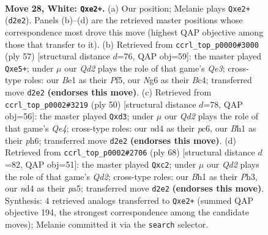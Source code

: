 \documentclass[11pt]{article}
\begin{document}
\clearpage

\begin{figure}[p]\centering
\begin{subfigure}{0.46\textwidth}\centering
\resizebox{\linewidth}{!}{%
\newchessgame
\chessboard[
  setfen={4k3/8/6N1/2pp1p2/3n2b1/1p6/1P1QqP2/K3B2B w - - 0 28},
  showmover=false,
  pgfstyle=straightmove, color=movearrow, markmove={d2-e2}
]}
\caption{}
\end{subfigure}\hfill
\begin{subfigure}{0.46\textwidth}\centering
\resizebox{\linewidth}{!}{%
\newchessgame
\chessboard[
  setfen={8/1p4pk/4q2p/4Qp2/P1b5/5N1P/1KP2PP1/8 b - - 0 29},
  showmover=false,
  pgfstyle=straightmove, color=movearrow, markmove={e6-e5}
]}
\caption{}
\end{subfigure}
\\[4pt]
\begin{subfigure}{0.46\textwidth}\centering
\resizebox{\linewidth}{!}{%
\newchessgame
\chessboard[
  setfen={6k1/p4pp1/b1p4p/8/4QPP1/2Bq3P/PP6/2K5 w - - 2 26},
  showmover=false,
  pgfstyle=straightmove, color=movearrow, markmove={e4-d3}
]}
\caption{}
\end{subfigure}\hfill
\begin{subfigure}{0.46\textwidth}\centering
\resizebox{\linewidth}{!}{%
\newchessgame
\chessboard[
  setfen={8/5ppk/4p2p/p3P3/P3b3/7P/1PqQ2PK/4B3 w - - 4 35},
  showmover=false,
  pgfstyle=straightmove, color=movearrow, markmove={d2-c2}
]}
\caption{}
\end{subfigure}
\caption{\textbf{Move 28, White: \texttt{Qxe2+}.} (a) Our position; Melanie plays \texttt{Qxe2+} (\texttt{d2e2}). Panels (b)--(d) are the retrieved master positions whose correspondence most drove this move (highest QAP objective among those that transfer to it). (b) Retrieved from \texttt{ccrl\_top\_p0000\#3000} (ply 57) [structural distance $d$=76, QAP obj=59]: the master played \texttt{Qxe5+}; under $\mu$ our \emph{Qd2} plays the role of that game's \emph{Qe3}; cross-type roles: our \emph{B}e1 as their \emph{P}f5, our \emph{N}g6 as their \emph{B}c4; transferred move \texttt{d2e2} \textbf{(endorses this move)}. (c) Retrieved from \texttt{ccrl\_top\_p0002\#3219} (ply 50) [structural distance $d$=78, QAP obj=56]: the master played \texttt{Qxd3}; under $\mu$ our \emph{Qd2} plays the role of that game's \emph{Qe4}; cross-type roles: our \emph{n}d4 as their \emph{p}c6, our \emph{B}h1 as their \emph{p}h6; transferred move \texttt{d2e2} \textbf{(endorses this move)}. (d) Retrieved from \texttt{ccrl\_top\_p0002\#2706} (ply 68) [structural distance $d$=82, QAP obj=51]: the master played \texttt{Qxc2}; under $\mu$ our \emph{Qd2} plays the role of that game's \emph{Qd2}; cross-type roles: our \emph{B}h1 as their \emph{P}h3, our \emph{n}d4 as their \emph{p}a5; transferred move \texttt{d2e2} \textbf{(endorses this move)}. Synthesis: 4 retrieved analogs transferred to \texttt{Qxe2+} (summed QAP objective 194, the strongest correspondence among the candidate moves); Melanie committed it via the \texttt{search} selector.}
\label{fig:thought-m54}
\end{figure}
\end{document}

